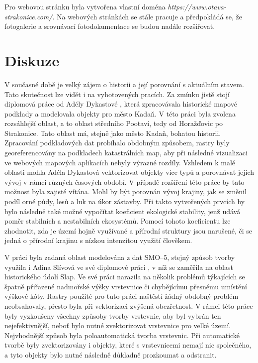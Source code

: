 \documentclass[thesis=M,czech]{FITthesis}[2012/06/26]
\begin{document}
Pro webovou stránku byla vytvořena vlastní doména \textit{https://www.otava-strakonice.com/}. Na webových stránkách se stále pracuje a předpokládá se, že fotogalerie a srovnávací fotodokumentace se budou nadále rozšiřovat.

\chapter{Diskuze}
V současné době je velký zájem o historii a její porovnání s aktuálním stavem. Tato skutečnost lze vidět i na vyhotovených pracích. Za zmínku jistě stojí diplomová práce od Adély Dykastové  \cite{dykastova}, která zpracovávala historické mapové podklady a modelovala objekty pro město Kadaň. V této práci byla zvolena rozsáhlejší oblast, a to oblast středního Pootaví, tedy od Horažďovic po Strakonice. Tato oblast má, stejně jako město Kadaň, bohatou historii. Zpracování podkladových dat probíhalo obdobným způsobem, rastry byly georeferencovány na podkladech katastrálních map, aby při následné vizualizaci ve webových mapových aplikacích nebyly výrazné rozdíly. Vzhledem k malé oblasti mohla Adéla Dykastová vektorizovat objekty více typů a porovnávat jejich vývoj v rámci různých časových období. V případě rozšíření této práce by tato možnost byla zajisté vítána. Mohl by být porovnán vývoj krajiny, jak se změnil podíl orné půdy, lesů a luk na úkor zástavby. Při takto vytvořených prvcích by bylo následně také možné vypočítat koeficient ekologické stability, jenž udává poměr stabilních a nestabilních ekosystémů. Pomocí tohoto koeficientu lze zhodnotit, zda je území hojně využívané a přírodní struktury jsou narušené, či se jedná o přírodní krajinu s nízkou intenzitou využití člověkem. 

V práci byla zadaná oblast modelována z dat SMO–5, stejný způsob tvorby využila i Adina Slívová ve své diplomové práci \cite{adina}, v níž se zaměřila na oblast historického údolí Slap. Ve své práci narazila na několik problémů týkajících se špatně přiřazené nadmořské výšky vrstevnice či chybějícímu přesnému umístění výškové kóty. Rastry použité pro tuto práci naštěstí žádný obdobný problém neobsahovaly, přesto byla při vektorizaci zvýšená obezřetnost. V rámci této práce byly vyzkoušeny všechny způsoby tvorby vrstevnic, aby byl vybrán ten nejefektivnější, neboť bylo nutné zvektorizovat vrstevnice pro velké území. Nejvhodnější způsob byla poloautomatická tvorba vrstevnic. Při automatické tvorbě byly zvektorizovány i objekty, které s vrstevnicemi nemají nic společného, a tyto objekty bylo nutné následně důkladně prozkoumat a odstranit. 
\end{document}
